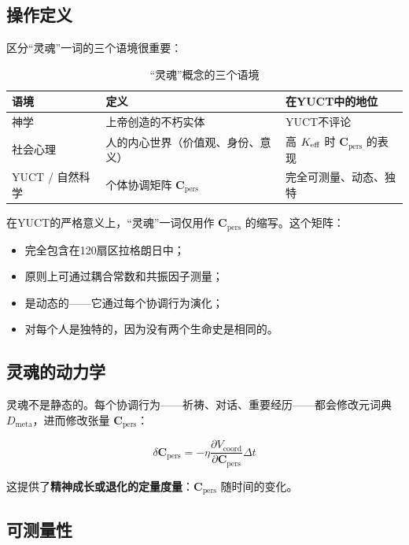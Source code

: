 \documentclass[11pt,a4paper]{article}
\newcommand{\Cpers}{\mathbf{C}_{\text{pers}}}
\begin{document}
	\subsection{操作定义}
	
	区分“灵魂”一词的三个语境很重要：
	
	\begin{table}[H]
		\centering
		\caption{“灵魂”概念的三个语境}
		\label{tab:soul-contexts}
		\begin{tabular}{p{3.5cm}p{5cm}p{5cm}}
			\toprule
			\textbf{语境} & \textbf{定义} & \textbf{在YUCT中的地位} \\
			\midrule
			神学 & 上帝创造的不朽实体 & YUCT不评论 \\
			社会心理 & 人的内心世界（价值观、身份、意义） & 高 \(\Keff\) 时 \(\Cpers\) 的表现 \\
			YUCT / 自然科学 & 个体协调矩阵 \(\Cpers\) & 完全可测量、动态、独特 \\
			\bottomrule
		\end{tabular}
	\end{table}
	
	在YUCT的严格意义上，“灵魂”一词仅用作 \(\Cpers\) 的缩写。这个矩阵：
	\begin{itemize}
		\item 完全包含在120扇区拉格朗日中；
		\item 原则上可通过耦合常数和共振因子测量；
		\item 是动态的——它通过每个协调行为演化；
		\item 对每个人是独特的，因为没有两个生命史是相同的。
	\end{itemize}
	
	\subsection{灵魂的动力学}
	
	灵魂不是静态的。每个协调行为——祈祷、对话、重要经历——都会修改元词典 \(D_{\text{meta}}\)，进而修改张量 \(\Cpers\)：
	
	\begin{equation}
		\delta \Cpers = -\eta \frac{\partial V_{\text{coord}}}{\partial \Cpers} \Delta t
	\end{equation}
	
	这提供了\textbf{精神成长或退化的定量度量}：\(\Cpers\) 随时间的变化。
	
	\subsection{可测量性}
	
\end{document}
